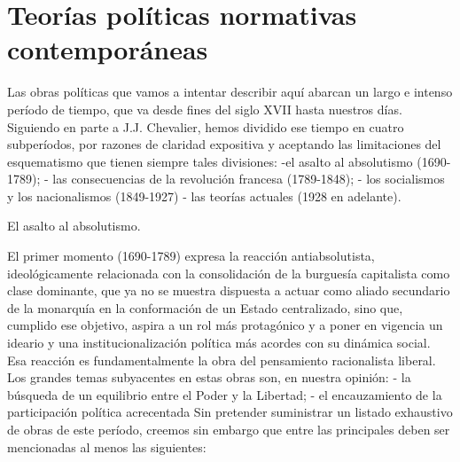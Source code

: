 \documentclass[
]{book}
\begin{document}
\hypertarget{teoruxedas-poluxedticas-normativas-contemporuxe1neas}{%
\section*{Teorías políticas normativas contemporáneas}\label{teoruxedas-poluxedticas-normativas-contemporuxe1neas}}

Las obras políticas que vamos a intentar describir aquí abarcan un largo e intenso período de tiempo, que va desde fines del siglo XVII hasta nuestros días. Siguiendo en parte a J.J. Chevalier, hemos dividido ese tiempo en cuatro subperíodos, por razones de claridad expositiva y aceptando las limitaciones del esquematismo que tienen siempre tales divisiones: -el asalto al absolutismo (1690-1789); - las consecuencias de la revolución francesa (1789-1848); - los socialismos y los nacionalismos (1849-1927) - las teorías actuales (1928 en adelante).

El asalto al absolutismo.

El primer momento (1690-1789) expresa la reacción antiabsolutista, ideológicamente relacionada con la consolidación de la burguesía capitalista como clase dominante, que ya no se muestra dispuesta a actuar como aliado secundario de la monarquía en la conformación de un Estado centralizado, sino que, cumplido ese objetivo, aspira a un rol más protagónico y a poner en vigencia un ideario y una institucionalización política más acordes con su dinámica social. Esa reacción es fundamentalmente la obra del pensamiento racionalista liberal. Los grandes temas subyacentes en estas obras son, en nuestra opinión: - la búsqueda de un equilibrio entre el Poder y la Libertad; - el encauzamiento de la participación política acrecentada Sin pretender suministrar un listado exhaustivo de obras de este período, creemos sin embargo que entre las principales deben ser mencionadas al menos las siguientes:
\end{document}
